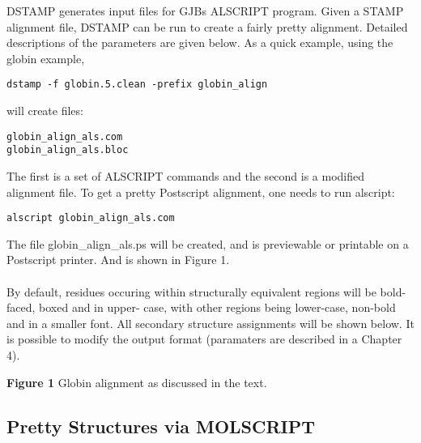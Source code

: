 DSTAMP generates input files for GJBs ALSCRIPT program.  Given a STAMP 
alignment file, DSTAMP can be run to create a fairly pretty alignment.
Detailed descriptions of the parameters are given below.  As a quick 
example, using the globin example,\\

\begin{scriptsize}\begin{verbatim}
dstamp -f globin.5.clean -prefix globin_align
\end{verbatim} \end{scriptsize}

will create files:

\begin{scriptsize}\begin{verbatim}
globin_align_als.com
globin_align_als.bloc
\end{verbatim} \end{scriptsize}

The first is a set of ALSCRIPT commands and the second is a modified
alignment file.  To get a pretty Postscript alignment, one needs to
run alscript:\\

\begin{scriptsize}\begin{verbatim}
alscript globin_align_als.com
\end{verbatim} \end{scriptsize}

The file globin\_align\_als.ps will be created, and is previewable or 
printable on a Postscript printer.  And is shown in Figure 1.\\
\\
By default, residues occuring within
structurally equivalent regions will be bold-faced, boxed and in upper-
case, with other regions being lower-case, non-bold and in a smaller 
font.  All secondary structure assignments will be shown below.  It is 
possible to modify the output format (paramaters are described in a Chapter 4).

\vspace*{3.5in}
\noindent
\begin{scriptsize}
{\bf Figure 1} Globin alignment as discussed in the text.
\end{scriptsize}

\subsection{Pretty Structures via MOLSCRIPT}


